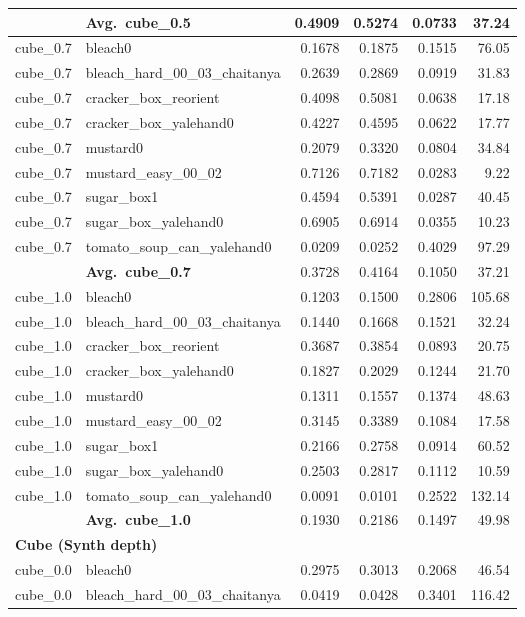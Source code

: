 \begin{longtable}{llrrrr}
  \cmidrule{2-6}
  & \textbf{Avg.~cube_0.5} & 0.4909 & 0.5274 & 0.0733 & 37.24 \\
  \midrule
  cube_0.7 & bleach0 & 0.1678 & 0.1875 & 0.1515 & 76.05 \\
  cube_0.7 & bleach\_hard\_00\_03\_chaitanya & 0.2639 & 0.2869 & 0.0919 & 31.83 \\
  cube_0.7 & cracker\_box\_reorient & 0.4098 & 0.5081 & 0.0638 & 17.18 \\
  cube_0.7 & cracker\_box\_yalehand0 & 0.4227 & 0.4595 & 0.0622 & 17.77 \\
  cube_0.7 & mustard0 & 0.2079 & 0.3320 & 0.0804 & 34.84 \\
  cube_0.7 & mustard\_easy\_00\_02 & 0.7126 & 0.7182 & 0.0283 & 9.22 \\
  cube_0.7 & sugar\_box1 & 0.4594 & 0.5391 & 0.0287 & 40.45 \\
  cube_0.7 & sugar\_box\_yalehand0 & 0.6905 & 0.6914 & 0.0355 & 10.23 \\
  cube_0.7 & tomato\_soup\_can\_yalehand0 & 0.0209 & 0.0252 & 0.4029 & 97.29 \\
  \cmidrule{2-6}
  & \textbf{Avg.~cube_0.7} & 0.3728 & 0.4164 & 0.1050 & 37.21 \\
  \midrule
  cube_1.0 & bleach0 & 0.1203 & 0.1500 & 0.2806 & 105.68 \\
  cube_1.0 & bleach\_hard\_00\_03\_chaitanya & 0.1440 & 0.1668 & 0.1521 & 32.24 \\
  cube_1.0 & cracker\_box\_reorient & 0.3687 & 0.3854 & 0.0893 & 20.75 \\
  cube_1.0 & cracker\_box\_yalehand0 & 0.1827 & 0.2029 & 0.1244 & 21.70 \\
  cube_1.0 & mustard0 & 0.1311 & 0.1557 & 0.1374 & 48.63 \\
  cube_1.0 & mustard\_easy\_00\_02 & 0.3145 & 0.3389 & 0.1084 & 17.58 \\
  cube_1.0 & sugar\_box1 & 0.2166 & 0.2758 & 0.0914 & 60.52 \\
  cube_1.0 & sugar\_box\_yalehand0 & 0.2503 & 0.2817 & 0.1112 & 10.59 \\
  cube_1.0 & tomato\_soup\_can\_yalehand0 & 0.0091 & 0.0101 & 0.2522 & 132.14 \\
  \cmidrule{2-6}
  & \textbf{Avg.~cube_1.0} & 0.1930 & 0.2186 & 0.1497 & 49.98 \\
  \midrule
\multicolumn{6}{l}{\textbf{Cube (Synth depth)}} \\
\midrule
  cube_0.0 & bleach0 & 0.2975 & 0.3013 & 0.2068 & 46.54 \\
  cube_0.0 & bleach\_hard\_00\_03\_chaitanya & 0.0419 & 0.0428 & 0.3401 & 116.42 \\

\end{longtable}
